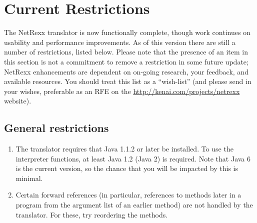\chapter{Current Restrictions}\label{restrictions}
The NetRexx translator is now functionally complete, though work continues on usability and performance improvements. As of this version there are still a number of restrictions, listed below. 
Please note that the presence of an item in this section is not a commitment to remove a restriction in some future update; NetRexx enhancements are dependent on on-going research, your feedback, and available resources. You should treat this list as a “wish-list” (and please send in your wishes, preferable as an RFE on the \url{http://kenai.com/projects/netrexx} website). 
\section{General restrictions}
\begin{enumerate}
\item The translator requires that Java 1.1.2 or later be installed. To use the interpreter functions, at least Java 1.2 (Java 2) is required. Note that Java 6 is the current version, so the chance that you will be impacted by this is minimal. 
\item Certain forward references (in particular, references to methods later in a program from the argument list of an earlier method) are not handled by the translator. For these, try reordering the methods.
\end{enumerate}
